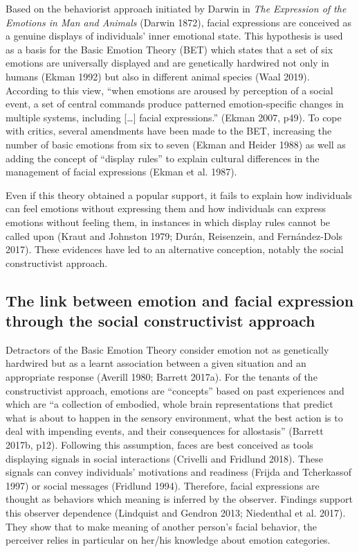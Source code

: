 \documentclass[conference,final,]{IEEEtran}
\begin{document}
Based on the behaviorist approach initiated by Darwin in \emph{The
Expression of the Emotions in Man and Animals} (Darwin 1872), facial
expressions are conceived as a genuine displays of individuals' inner
emotional state. This hypothesis is used as a basis for the Basic
Emotion Theory (BET) which states that a set of six emotions are
universally displayed and are genetically hardwired not only in humans
(Ekman 1992) but also in different animal species (Waal 2019). According
to this view, ``when emotions are aroused by perception of a social
event, a set of central commands produce patterned emotion-specific
changes in multiple systems, including {[}\ldots{}{]} facial
expressions.'' (Ekman 2007, p49). To cope with critics, several
amendments have been made to the BET, increasing the number of basic
emotions from six to seven (Ekman and Heider 1988) as well as adding the
concept of ``display rules'' to explain cultural differences in the
management of facial expressions (Ekman et al. 1987).

Even if this theory obtained a popular support, it fails to explain how
individuals can feel emotions without expressing them and how
individuals can express emotions without feeling them, in instances in
which display rules cannot be called upon (Kraut and Johnston 1979;
Durán, Reisenzein, and Fernández-Dols 2017). These evidences have led to
an alternative conception, notably the social constructivist approach.

\hypertarget{the-link-between-emotion-and-facial-expression-through-the-social-constructivist-approach}{%
\subsection{The link between emotion and facial expression through the
social constructivist
approach}\label{the-link-between-emotion-and-facial-expression-through-the-social-constructivist-approach}}

Detractors of the Basic Emotion Theory consider emotion not as
genetically hardwired but as a learnt association between a given
situation and an appropriate response (Averill 1980; Barrett 2017a). For
the tenants of the constructivist approach, emotions are ``concepts''
based on past experiences and which are ``a collection of embodied,
whole brain representations that predict what is about to happen in the
sensory environment, what the best action is to deal with impending
events, and their consequences for allostasis'' (Barrett 2017b, p12).
Following this assumption, faces are best conceived as tools displaying
signals in social interactions (Crivelli and Fridlund 2018). These
signals can convey individuals' motivations and readiness (Frijda and
Tcherkassof 1997) or social messages (Fridlund 1994). Therefore, facial
expressions are thought as behaviors which meaning is inferred by the
observer. Findings support this observer dependence (Lindquist and
Gendron 2013; Niedenthal et al. 2017). They show that to make meaning of
another person's facial behavior, the perceiver relies in particular on
her/his knowledge about emotion categories.
\end{document}
